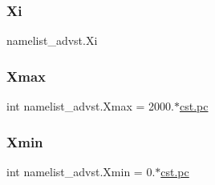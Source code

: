 \subsubsection{\texorpdfstring{Xi}{Xi}}
{\footnotesize\ttfamily namelist\+\_\+advst.\+Xi}

\mbox{\label{namespacenamelist__advst_a454de5ba953a2b423c001eb8b77fb0dc}} 
\subsubsection{\texorpdfstring{Xmax}{Xmax}}
{\footnotesize\ttfamily int namelist\+\_\+advst.\+Xmax = 2000.$\ast$\hyperlink{constants_8h_a2884cd030c4c825754349a525a1d06ce}{cst.\+pc}}

\mbox{\label{namespacenamelist__advst_a6d9186a3779059c135060e63cd560845}} 
\subsubsection{\texorpdfstring{Xmin}{Xmin}}
{\footnotesize\ttfamily int namelist\+\_\+advst.\+Xmin = 0.$\ast$\hyperlink{constants_8h_a2884cd030c4c825754349a525a1d06ce}{cst.\+pc}}

